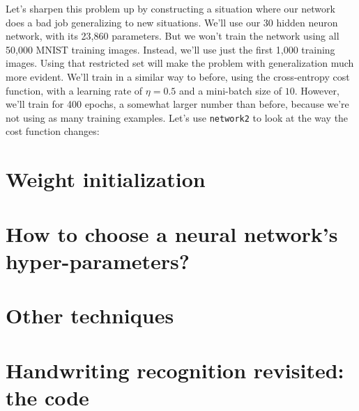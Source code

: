 \documentclass[a4paper,11pt,twoside]{report}
\begin{document}
Let's sharpen this problem up by constructing a situation where our network does a bad job generalizing to new situations. We'll use our 30 hidden neuron network, with its 23,860 parameters. But we won't train the network using all 50,000 MNIST training images. Instead, we'll use just the first 1,000 training images. Using that restricted set will make the problem with generalization much more evident. We'll train in a similar way to before, using the cross-entropy cost function, with a learning rate of $\eta=0.5$ and a mini-batch size of $10$. However, we'll train for 400 epochs, a somewhat larger number than before, because we're not using as many training examples. Let's use \texttt{network2} to look at the way the cost function changes:






































\section{Weight initialization}
\label{sec: Weight initialization}


\section{How to choose a neural network's hyper-parameters?}
\label{sec: How to choose a neural network's hyper-parameters?}


\section{Other techniques}
\label{sec: Other techniques}



\section{Handwriting recognition revisited: the code}
\label{sec: Handwriting recognition revisited: the code}
























\newpage
\nocite{*}
%
\end{document}
